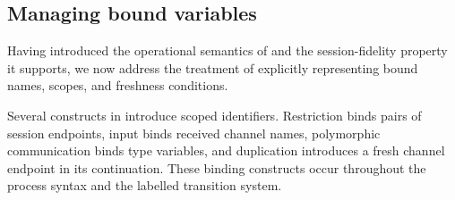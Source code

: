 



  \subsection{Managing bound variables}\label{subsec:burden-of-bound-variables}
  Having introduced the operational semantics of \pill{} and the session-fidelity property it supports, we now address the treatment of explicitly representing bound names, scopes, and freshness conditions.

  Several constructs in \pill{} introduce scoped identifiers. Restriction binds pairs of session endpoints, input binds received channel names, polymorphic communication binds type variables, and duplication introduces a fresh channel endpoint in its continuation. These binding constructs occur throughout the process syntax and the labelled transition system.

